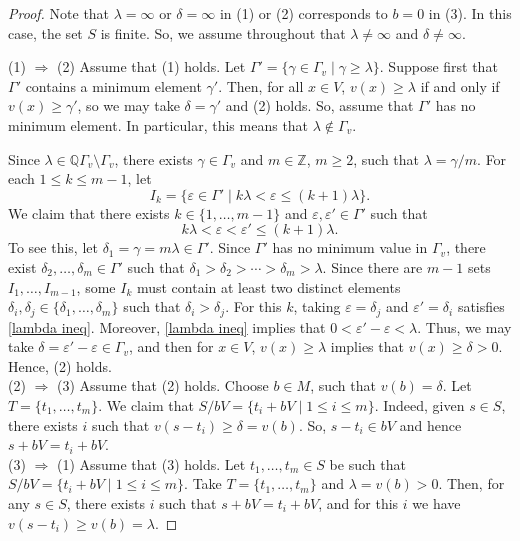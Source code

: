 \documentclass{article}
\theoremstyle{definition}\newtheorem{Def}[equation]{Definition}
\theoremstyle{definition}\newtheorem{Ques}[equation]{Question}
\theoremstyle{definition}\newtheorem{Conj}[equation]{Conjecture}
\theoremstyle{definition}\newtheorem{Not}[equation]{Notation}
\newcommand{\Q}{\mathbb{Q}}
\newcommand{\Z}{\mathbb{Z}}
\numberwithin{equation}{section}
\begin{document}
\begin{proof}
Note that $\lambda = \infty$ or $\delta=\infty$ in (1) or (2) corresponds to $b=0$ in (3). In this case, the set $S$ is finite. So, we assume throughout that $\lambda\ne \infty$ and $\delta \ne \infty$.


(1) $\Rightarrow$ (2) Assume that (1) holds. Let $\Gamma' = \{\gamma \in \Gamma_v \mid \gamma  \geq \lambda\}$. Suppose first that $\Gamma'$ contains a minimum element $\gamma'$. Then, for all $x \in V$,  $v(x) \geq \lambda$ if and only if $v(x) \geq \gamma'$, so we may take $\delta = \gamma'$ and (2) holds. So, assume that $\Gamma'$ has no minimum element. In particular, this means that $\lambda \notin \Gamma_v$.

Since $\lambda \in \Q\Gamma_v\setminus \Gamma_v$, there exists $\gamma \in \Gamma_v$ and $m \in \Z$, $m \geq 2$, such that $\lambda = \gamma/m$. For each $1 \leq k \leq m-1$, let 
\begin{equation*}
I_k = \{\varepsilon \in \Gamma' \mid k\lambda < \varepsilon \leq (k+1)\lambda\}.
\end{equation*}
We claim that there exists $k \in \{1, \ldots, m-1\}$ and $\varepsilon, \varepsilon' \in \Gamma'$ such that
\begin{equation}\label{lambda ineq}
k\lambda < \varepsilon < \varepsilon' \leq (k+1)\lambda.
\end{equation}
To see this, let $\delta_1 = \gamma = m\lambda \in \Gamma'$. Since $\Gamma'$ has no minimum value in $\Gamma_v$, there exist $\delta_2, \ldots, \delta_m \in \Gamma'$ such that $\delta_1 > \delta_2 > \cdots > \delta_m > \lambda$. Since there are $m-1$ sets $I_1, \ldots, I_{m-1}$, some $I_k$ must contain at least two distinct elements $\delta_i, \delta_j \in \{\delta_1, \ldots, \delta_m\}$ such that $\delta_i > \delta_j$. For this $k$, taking $\varepsilon=\delta_j$ and $\varepsilon'=\delta_i$ satisfies \eqref{lambda ineq}. Moreover, \eqref{lambda ineq} implies that $0 < \varepsilon'-\varepsilon < \lambda$. Thus, we may take $\delta = \varepsilon'-\varepsilon \in \Gamma_v$, and then for $x \in V$, $v(x) \geq \lambda$ implies that $v(x) \geq \delta > 0$. Hence, (2) holds.\\

(2) $\Rightarrow$ (3) Assume that (2) holds. Choose $b \in M$, such that $v(b) = \delta$. Let $T = \{t_1, \ldots, t_m\}$. We claim that $S/bV = \{t_i + bV \mid 1 \leq i \leq m\}$. Indeed, given $s \in S$, there exists $i$ such that $v(s-t_i) \geq \delta=v(b)$. So, $s-t_i \in bV$ and hence $s+bV = t_i + bV$.\\

(3) $\Rightarrow$ (1) Assume that (3) holds. Let $t_1, \ldots, t_m \in S$ be such that $S/bV = \{t_i + bV \mid 1 \leq i \leq m\}$. Take $T = \{t_1, \ldots, t_m\}$ and $\lambda = v(b) > 0$. Then, for any $s \in S$, there exists $i$ such that $s+bV = t_i +bV$, and for this $i$ we have $v(s-t_i) \geq v(b) = \lambda$.\end{proof}
\end{document}
